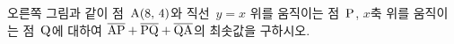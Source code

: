 \noindent\begin{minipage}[t]{0.58\linewidth}\vspace{0pt}\raggedright 오른쪽 그림과 같이 점~$\mathrm{A}(8,\mkern3mu 4)$와 직선~$y=x$ 위를 움직이는 점~$\mathrm{P}$, $x$축 위를 움직이는 점~$\mathrm{Q}$에 대하여 $\overline{\mathrm{AP}}+\overline{\mathrm{PQ}}+\overline{\mathrm{QA}}$의 최솟값을 구하시오.\end{minipage}\hfill\begin{minipage}[t]{0.4\linewidth}\vspace{0pt}\centering \resizebox{\ifdim\width>\linewidth\linewidth\else\width\fi}{!}{}\end{minipage}\par
